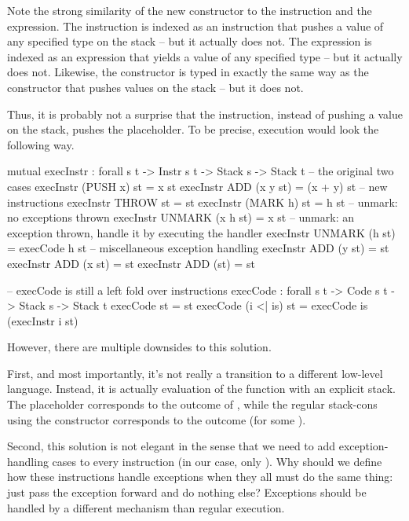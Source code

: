 Note the strong similarity of the new constructor \ident{\void\scons\_} to the
 instruction and the 
expression. The instruction  is indexed as an instruction that pushes
a value of any specified type on the stack -- but it actually does not. The 
 expression is indexed as an expression that yields a value of any specified
type -- but it actually does not. Likewise, the \ident{\void} constructor is typed in
exactly the same way as the constructor that pushes values on the stack -- but it does not.

Thus, it is probably not a surprise that the  instruction, instead of pushing
a value on the stack, pushes the \ident{\void} placeholder. To be precise, execution would
look the following way.
\begin{code}
  mutual
    execInstr : forall {s t} -> Instr s t -> Stack s -> Stack t
    -- the original two cases
    execInstr (PUSH x) st = x \scons st
    execInstr ADD (x \scons y \scons st) = (x + y) \scons st
    -- new instructions
    execInstr THROW st = \void\scons st
    execInstr (MARK h) st = h \sconsh st
    -- unmark: no exceptions thrown
    execInstr UNMARK (x \scons h \sconsh st) = x \scons st
    -- unmark: an exception thrown, handle it by executing the handler
    execInstr UNMARK (\void\scons h \sconsh st) = execCode h st
    -- miscellaneous exception handling
    execInstr ADD (\void\scons y \scons st) = \void\scons st
    execInstr ADD (x \scons \void\scons st) = \void\scons st
    execInstr ADD (\void\scons \void\scons st) = \void\scons st

    -- execCode is still a left fold over instructions
    execCode : forall {s t} -> Code s t -> Stack s -> Stack t
    execCode \nil st = st
    execCode (i <| is) st = execCode is (execInstr i st)
\end{code}

\noindent However, there are multiple downsides to this solution.

First, and most importantly, it's not really a transition to a different low-level language.
Instead, it is actually evaluation of the function  with an explicit
stack. The placeholder \ident{\void} corresponds to the outcome  of
, while the regular stack-cons using the constructor \ident{\scons\!\!}
corresponds to the outcome  (for some ).

Second, this solution is not elegant in the sense that we need to add exception-handling
cases to every instruction (in our case, only ). Why should we define how
these instructions handle exceptions when they all must do the same thing: just pass
the exception forward and do nothing else? Exceptions should be handled by a different
mechanism than regular execution.


